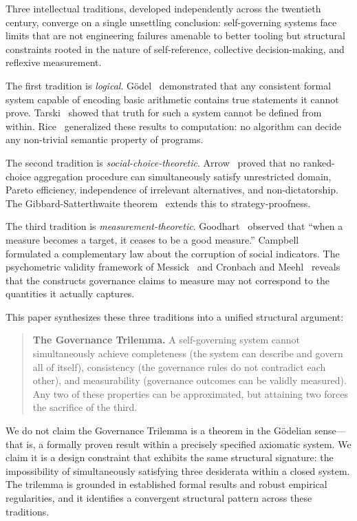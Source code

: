 \documentclass[12pt,a4paper]{article}
\begin{document}
Three intellectual traditions, developed independently across the twentieth
century, converge on a single unsettling conclusion: self-governing systems
face limits that are not engineering failures amenable to better tooling but
structural constraints rooted in the nature of self-reference, collective
decision-making, and reflexive measurement.

The first tradition is \emph{logical}. G\"{o}del~\cite{Godel1931}
demonstrated that any consistent formal system capable of encoding basic
arithmetic contains true statements it cannot prove. Tarski~\cite{Tarski1933}
showed that truth for such a system cannot be defined from within.
Rice~\cite{Rice1953} generalized these results to computation: no algorithm
can decide any non-trivial semantic property of programs.

The second tradition is \emph{social-choice-theoretic}.
Arrow~\cite{Arrow1950,Arrow1951} proved that no ranked-choice aggregation
procedure can simultaneously satisfy unrestricted domain, Pareto efficiency,
independence of irrelevant alternatives, and non-dictatorship. The
Gibbard-Satterthwaite theorem~\cite{Gibbard1973,Satterthwaite1975} extends
this to strategy-proofness.

The third tradition is \emph{measurement-theoretic}. Goodhart~\cite{Goodhart1975}
observed that ``when a measure becomes a target, it ceases to be a good
measure.'' Campbell~\cite{Campbell1979} formulated a complementary law about
the corruption of social indicators. The psychometric validity framework of
Messick~\cite{Messick1989} and Cronbach and Meehl~\cite{CronbachMeehl1955}
reveals that the constructs governance claims to measure may not correspond to
the quantities it actually captures.

This paper synthesizes these three traditions into a unified structural
argument:

\begin{quote}
\textbf{The Governance Trilemma.} A self-governing system cannot
simultaneously achieve completeness (the system can describe and govern all of
itself), consistency (the governance rules do not contradict each other), and
measurability (governance outcomes can be validly measured). Any two of these
properties can be approximated, but attaining two forces the sacrifice of the
third.
\end{quote}

We do not claim the Governance Trilemma is a theorem in the G\"{o}delian
sense---that is, a formally proven result within a precisely specified
axiomatic system. We claim it is a design constraint that exhibits the same
structural signature: the impossibility of simultaneously satisfying three
desiderata within a closed system. The trilemma is grounded in established
formal results and robust empirical regularities, and it identifies a
convergent structural pattern across these traditions.
\end{document}
